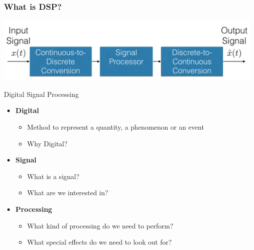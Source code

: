 \documentclass[mathserif,9pt,handout]{beamer}
\begin{document}
\begin{frame}\frametitle{What is DSP?}\small
  \begin{center}
    \includegraphics[width=.9\textwidth]{dsp_flow.pdf}
  \end{center}
  \begin{exampleblock}{\small Digital Signal Processing}
  \begin{itemize}
    \item {\bf\color{green!50!black}Digital} 
      \begin{itemize}
        \item Method to represent a quantity, a phenomenon or an event
        \item Why Digital?
      \end{itemize}
    \item {\bf\color{green!50!black}Signal}
      \begin{itemize}
        \item What is a signal?
        \item What are we interested in?
      \end{itemize}
    \item {\bf\color{green!50!black}Processing}
      \begin{itemize}
        \item What kind of processing do we need to perform?
        \item What special effects do we need to look out for?
      \end{itemize}
  \end{itemize}
  \end{exampleblock}
\end{frame}
\end{document}
